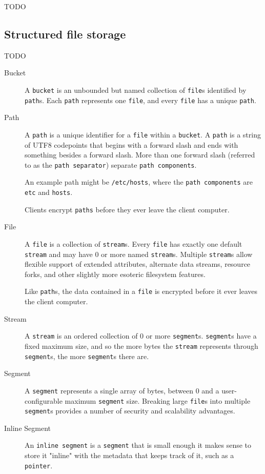 \documentclass[a4paper,10pt]{article}
\newcommand{\x}[1]{{\tt #1}}
\newcommand{\code}[1]{{\tt #1}}
\newcommand{\todo}[1]{{\color{red} TODO #1}}
\begin{document}
\todo{}

\subsection{Structured file storage}

\todo{}

\begin{description}
\item[Bucket] A \x{bucket} is an unbounded but named collection of
\x{file}s identified by \x{path}s. Each \x{path} represents one
\x{file}, and every \x{file} has a unique \x{path}.

\item[Path] A \x{path} is a unique identifier for a \x{file} within a
\x{bucket}. A \x{path} is a string of UTF8 codepoints that begins with a forward
slash and ends with something besides a forward slash. More than one forward
slash (referred to as the \x{path separator}) separate \x{path components}.

An example path might be \code{/etc/hosts}, where the \x{path components} are
\code{etc} and \code{hosts}.

Clients encrypt \x{paths} before they ever leave the client computer.

\item[File] A \x{file} is a collection of \x{stream}s. Every \x{file} has
exactly one default \x{stream} and may have 0 or more named \x{stream}s.
Multiple \x{stream}s allow flexible support of extended attributes, alternate
data streams, resource forks, and other slightly more esoteric filesystem
features.

Like \x{path}s, the data contained in a \x{file} is encrypted before it ever
leaves the client computer.

\item[Stream] A \x{stream} is an ordered collection of 0 or more \x{segment}s.
\x{segment}s have a fixed maximum size, and so the more bytes the \x{stream}
represents through \x{segment}s, the more \x{segment}s there are.

\item[Segment] A \x{segment} represents a single array of bytes, between 0 and a
user-configurable maximum \x{segment} size. Breaking large \x{file}s into
multiple \x{segment}s provides a number of security and scalability advantages.

\item[Inline Segment] An \x{inline segment} is a \x{segment} that is small
enough it makes sense to store it "inline" with the metadata that keeps track of
it, such as a \x{pointer}.


\end{description}
\end{document}
